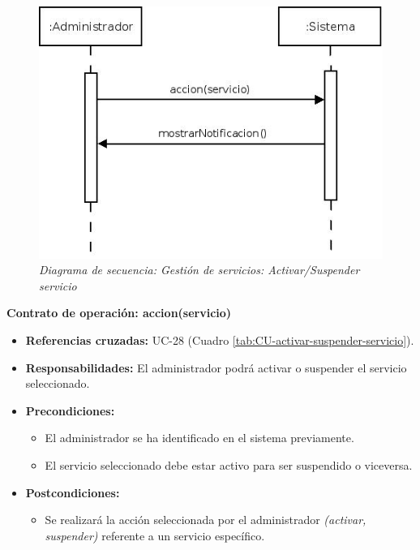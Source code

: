 \begin{figure}[H]
\centering
  \includegraphics[scale=.55]{img/secuencias/gestion-servicios-suspender-activar-servicio.jpeg}
  \caption{\textit{Diagrama de secuencia: Gestión de servicios: Activar/Suspender servicio}}
  \label{fig:secuencia-gestion-servicios-suspender-activar-servicio}
\end{figure}

\textbf{Contrato de operación: accion(servicio)}
\begin{itemize}
\item \textbf{Referencias cruzadas:} UC-28 (Cuadro \ref{tab:CU-activar-suspender-servicio}).
\item \textbf{Responsabilidades:} El administrador podrá activar o suspender el servicio seleccionado.
\item \textbf{Precondiciones:} 
 \begin{itemize}
\item El administrador se ha identificado en el sistema previamente.
\item El servicio seleccionado debe estar activo para ser suspendido o viceversa.
\end {itemize}
\item \textbf{Postcondiciones:} 
 \begin{itemize}
\item Se realizará la acción seleccionada por el administrador \textit{(activar, suspender)} referente a un servicio específico.
\end {itemize}
\end {itemize}

